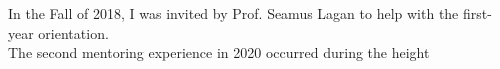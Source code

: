 \documentclass[../../../main.tex]{subfiles}
\begin{document}
\label{sec:first_year}

In the Fall of 2018, I was invited by Prof. Seamus Lagan to help with the first-year orientation.  
\\
\vspace{0.15cm}
The second mentoring experience in 2020 occurred during the height
\end{document}

